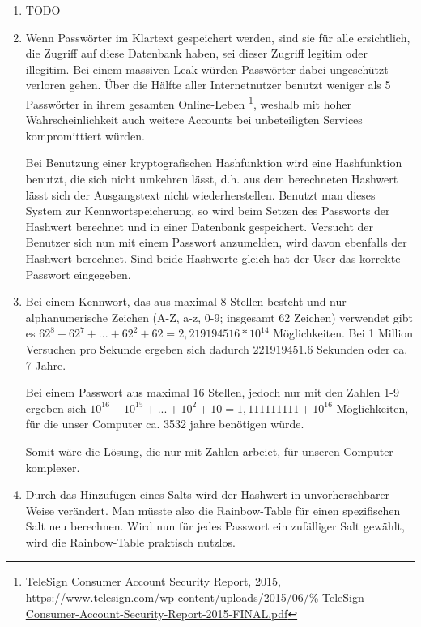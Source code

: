 \documentclass[a4paper,11pt]{scrartcl}
\begin{document}
\begin{enumerate}[1.]
    \item TODO
    \item
        Wenn Passwörter im Klartext gespeichert werden, sind sie für alle
        ersichtlich, die Zugriff auf diese Datenbank haben, sei dieser Zugriff
        legitim oder illegitim. Bei einem massiven Leak würden Passwörter
        dabei ungeschützt verloren gehen. Über die Hälfte aller Internetnutzer
        benutzt weniger als 5 Passwörter in ihrem gesamten Online-Leben%
        \footnote{TeleSign Consumer Account Security Report, 2015,\\%
        \url{https://www.telesign.com/wp-content/uploads/2015/06/%
        TeleSign-Consumer-Account-Security-Report-2015-FINAL.pdf}},
        weshalb mit hoher Wahrscheinlichkeit auch weitere Accounts bei unbeteiligten
        Services kompromittiert würden.

        Bei Benutzung einer kryptografischen Hashfunktion wird eine Hashfunktion
        benutzt, die sich nicht umkehren lässt, d.h. aus dem berechneten
        Hashwert lässt sich der Ausgangstext nicht wiederherstellen. Benutzt man
        dieses System zur Kennwortspeicherung, so wird beim Setzen des Passworts
        der Hashwert berechnet und in einer Datenbank gespeichert. Versucht der
        Benutzer sich nun mit einem Passwort anzumelden, wird davon ebenfalls
        der Hashwert berechnet. Sind beide Hashwerte gleich hat der User das
        korrekte Passwort eingegeben.

    \item 
    	Bei einem Kennwort, das aus maximal 8 Stellen besteht und nur alphanumerische Zeichen (A-Z, a-z, 0-9; insgesamt 62 Zeichen) verwendet gibt es
    	\(62^8 + 62^7 + ... + 62^2 + 62 = 2,219194516*10^{14}\) Möglichkeiten. Bei 1 Million Versuchen pro Sekunde ergeben sich dadurch \(221919451.6\) Sekunden oder ca. 7 Jahre.

    	Bei einem Passwort aus maximal 16 Stellen, jedoch nur mit den Zahlen 1-9 ergeben sich \(10^{16} + 10^{15} + ... + 10^2 + 10 = 1,111111111+10^{16}\) Möglichkeiten,
    	für die unser Computer ca. 3532 jahre benötigen würde.
    	
    	Somit wäre die Lösung, die nur mit Zahlen arbeiet, für unseren Computer
    	komplexer.



    \item
        Durch das Hinzufügen eines Salts wird der Hashwert in unvorhersehbarer
        Weise verändert. Man müsste also die Rainbow-Table für einen spezifischen
        Salt neu berechnen. Wird nun für jedes Passwort ein zufälliger Salt
        gewählt, wird die Rainbow-Table praktisch nutzlos.


\end{enumerate}
\end{document}
